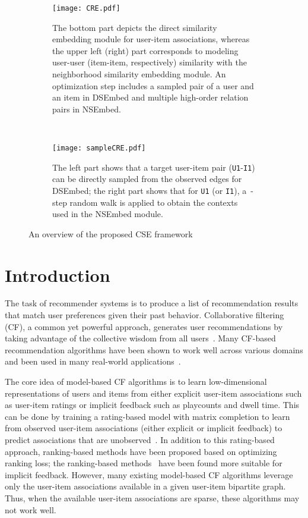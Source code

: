 \documentclass[sigconf,anonymous=false]{acmart}
\begin{document}
\begin{figure*}
\centering
\begin{subfigure}[b]{0.6\textwidth}
    \texttt{[image: CRE.pdf]}
    \caption{The bottom part depicts the direct similarity embedding module for
      user-item associations, whereas the upper left (right) part corresponds to
      modeling user-user (item-item, respectively) similarity with the
      neighborhood similarity embedding module.  An optimization step
    includes a sampled pair of a user and an item in DSEmbed and multiple high-order
  relation pairs in NSEmbed.}
\end{subfigure}
~
\begin{subfigure}[b]{0.38\textwidth}
    \texttt{[image: sampleCRE.pdf]}
    \caption{The left part shows that a target user-item pair
      (\texttt{U1}-\texttt{I1}) can be directly sampled from the observed edges
      for DSEmbed; the right part shows that for \texttt{U1} (or \texttt{I1}),
      a~-step random walk is applied to obtain the contexts used in the
      NSEmbed module.}
\end{subfigure}
\caption{An overview of the proposed CSE framework}
\label{fig:overview}
\end{figure*}


\section{Introduction}

The task of recommender systems is to produce a list of recommendation results
that match user preferences given their past behavior.
Collaborative filtering (CF), a common yet powerful approach, generates
user recommendations by taking advantage of the collective wisdom from all
users~\cite{cacm}.
Many CF-based recommendation algorithms have been shown to work well across
various domains and been used in many real-world
applications~\cite{su2009survey}.

The core idea of model-based CF algorithms is to learn low-dimensional
representations of users and items from either explicit user-item associations
such as user-item ratings or implicit feedback such as playcounts and dwell
time.
This can be done by training a rating-based model with matrix completion to
learn from observed user-item associations (either explicit or implicit
feedback) to predict associations that are
unobserved~\cite{i2v,glslim,cml,wals,svd++,mf,cofactor,slim,e2r,nerm,pmf}.
In addition to this rating-based approach, ranking-based methods have been
proposed based on optimizing ranking loss; the ranking-based
methods~\cite{e2r,bpr,warp,kos,walkranker} have been found more suitable for
implicit feedback.
However, many existing model-based CF algorithms leverage only the user-item
associations available in a given user-item bipartite graph.
Thus, when the available user-item associations are sparse, these
algorithms may not work well.
\end{document}
